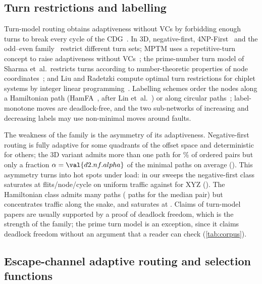 \subsection{Turn restrictions and labelling}
\label{sec:rev-turn}

Turn-model routing obtains adaptiveness without VCs by forbidding enough turns to break every cycle of the CDG~\cite{glass1992turn}. In 3D, negative-first, 4NP-First~\cite{pasricha2011lowoverhead} and the odd--even family~\cite{chiu2000oddeven} restrict different turn sets; MPTM uses a repetitive-turn concept to raise adaptiveness without VCs~\cite{cai2020mptm}; the prime-number turn model of Sharma et~al.\ restricts turns according to number-theoretic properties of node coordinates~\cite{sharma2023prime}; and Liu and Radetzki compute optimal turn restrictions for chiplet systems by integer linear programming~\cite{liu2024ilp}. Labelling schemes order the nodes along a Hamiltonian path (HamFA~\cite{ebrahimi2013hamfa}, after Lin et~al.~\cite{lin1994hamiltonian}) or along circular paths~\cite{alizadeh2014circular}; label-monotone moves are deadlock-free, and the two sub-networks of increasing and decreasing labels may use non-minimal moves around faults.

The weakness of the family is the asymmetry of its adaptiveness. Negative-first routing is fully adaptive for some quadrants of the offset space and deterministic for others; the 3D variant admits more than one path for \% of ordered pairs but only a fraction $\alpha=\val{d2.nf.alpha}$ of the minimal paths on average (). This asymmetry turns into hot spots under load: in our sweeps the negative-first class saturates at  flits/node/cycle on uniform traffic against  for XYZ (). The Hamiltonian class admits many paths ( paths for the median pair) but concentrates traffic along the snake, and saturates at . Claims of turn-model papers are usually supported by a proof of deadlock freedom, which is the strength of the family; the prime turn model is an exception, since it claims deadlock freedom without an argument that a reader can check (\cref{tab:corpus}).

\subsection{Escape-channel adaptive routing and selection functions}
\label{sec:rev-escape}

